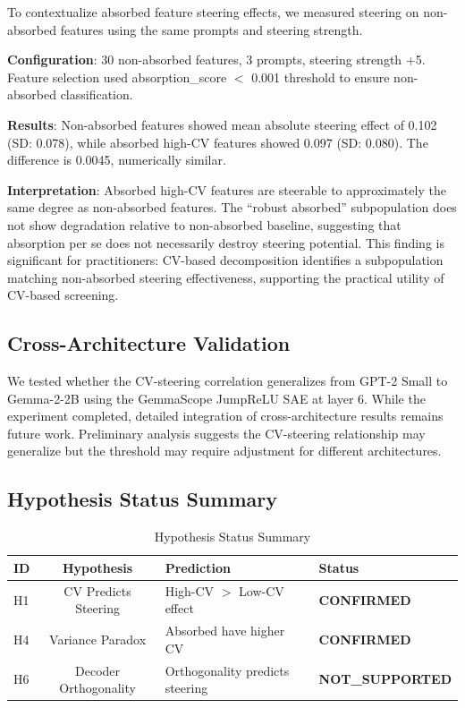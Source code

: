 \documentclass{article}
\begin{document}
To contextualize absorbed feature steering effects, we measured steering on non-absorbed features using the same prompts and steering strength.

\textbf{Configuration}: 30 non-absorbed features, 3 prompts, steering strength +5. Feature selection used absorption\_score $<$ 0.001 threshold to ensure non-absorbed classification.

\textbf{Results}: Non-absorbed features showed mean absolute steering effect of 0.102 (SD: 0.078), while absorbed high-CV features showed 0.097 (SD: 0.080). The difference is 0.0045, numerically similar.

\textbf{Interpretation}: Absorbed high-CV features are steerable to approximately the same degree as non-absorbed features. The ``robust absorbed'' subpopulation does not show degradation relative to non-absorbed baseline, suggesting that absorption per se does not necessarily destroy steering potential. This finding is significant for practitioners: CV-based decomposition identifies a subpopulation matching non-absorbed steering effectiveness, supporting the practical utility of CV-based screening.

\subsection{Cross-Architecture Validation}

We tested whether the CV-steering correlation generalizes from GPT-2 Small to Gemma-2-2B using the GemmaScope JumpReLU SAE at layer 6. While the experiment completed, detailed integration of cross-architecture results remains future work. Preliminary analysis suggests the CV-steering relationship may generalize but the threshold may require adjustment for different architectures.

\subsection{Hypothesis Status Summary}

\begin{table}[t]
\caption{Hypothesis Status Summary}
\label{tab:hypotheses}
\centering
\small
\begin{tabular}{lcll}
\toprule
ID & Hypothesis & Prediction & Status \\
\midrule
H1 & CV Predicts Steering & High-CV $>$ Low-CV effect & \textbf{CONFIRMED} \\
H4 & Variance Paradox & Absorbed have higher CV & \textbf{CONFIRMED} \\
H6 & Decoder Orthogonality & Orthogonality predicts steering & \textbf{NOT\_SUPPORTED} \\
\bottomrule
\end{tabular}
\end{table}
\end{document}
